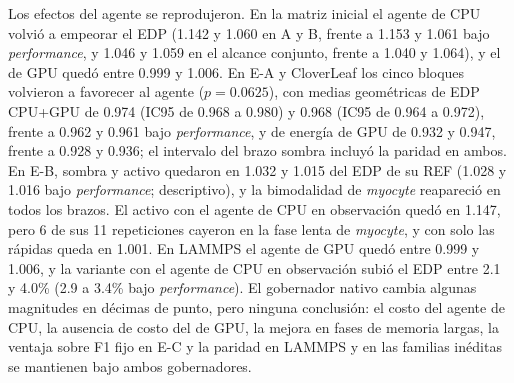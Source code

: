 Los efectos del agente se reprodujeron. En la matriz inicial el agente de CPU volvió a empeorar el EDP (1.142 y 1.060 en A y B, frente a 1.153 y 1.061 bajo \textit{performance}, y 1.046 y 1.059 en el alcance conjunto, frente a 1.040 y 1.064), y el de GPU quedó entre 0.999 y 1.006. En E-A y CloverLeaf los cinco bloques volvieron a favorecer al agente ($p=0.0625$), con medias geométricas de EDP CPU+GPU de 0.974 (IC95 de 0.968 a 0.980) y 0.968 (IC95 de 0.964 a 0.972), frente a 0.962 y 0.961 bajo \textit{performance}, y de energía de GPU de 0.932 y 0.947, frente a 0.928 y 0.936; el intervalo del brazo sombra incluyó la paridad en ambos. En E-B, sombra y activo quedaron en 1.032 y 1.015 del EDP de su REF (1.028 y 1.016 bajo \textit{performance}; descriptivo), y la bimodalidad de \textit{myocyte} reapareció en todos los brazos. El activo con el agente de CPU en observación quedó en 1.147, pero 6 de sus 11 repeticiones cayeron en la fase lenta de \textit{myocyte}, y con solo las rápidas queda en 1.001. En LAMMPS el agente de GPU quedó entre 0.999 y 1.006, y la variante con el agente de CPU en observación subió el EDP entre 2.1 y 4.0\% (2.9 a 3.4\% bajo \textit{performance}). El gobernador nativo cambia algunas magnitudes en décimas de punto, pero ninguna conclusión: el costo del agente de CPU, la ausencia de costo del de GPU, la mejora en fases de memoria largas, la ventaja sobre F1 fijo en E-C y la paridad en LAMMPS y en las familias inéditas se mantienen bajo ambos gobernadores.
